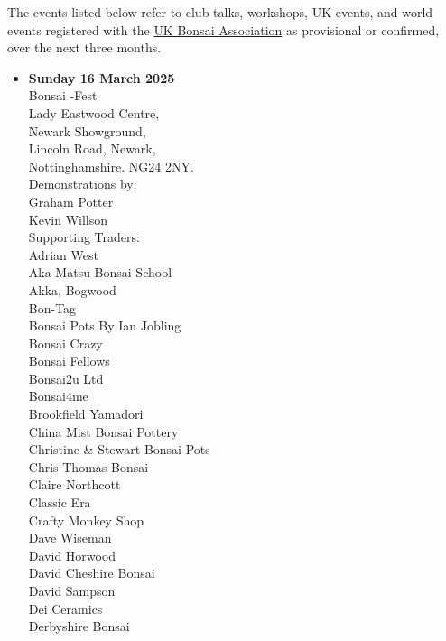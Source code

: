 \label{2025-03-events}
\noindent
The events listed below refer to club talks, workshops, UK events, and world events registered with the \href{https://www.ukbonsaiassoc.org/events.html}{UK Bonsai Association} as provisional or confirmed, over the next three months.
\begin{itemize}

    \item \textbf{Sunday 16 March 2025}
    \\
    Bonsai -Fest \\
    Lady Eastwood Centre, \\
    Newark Showground, \\
    Lincoln Road, Newark, \\
    Nottinghamshire. NG24 2NY. \\
    Demonstrations by: \\
    Graham Potter \\
    Kevin Willson \\
    Supporting Traders: \\
    Adrian West \\
    Aka Matsu Bonsai School \\
    Akka, Bogwood \\
    Bon-Tag \\
    Bonsai Pots By Ian Jobling \\
    Bonsai Crazy \\
    Bonsai Fellows \\
    Bonsai2u Ltd \\
    Bonsai4me \\
    Brookfield Yamadori \\
    China Mist Bonsai Pottery \\
    Christine \& Stewart Bonsai Pots \\
    Chris Thomas Bonsai \\
    Claire Northcott \\
    Classic Era \\
    Crafty Monkey Shop \\
    Dave Wiseman \\
    David Horwood \\
    David Cheshire Bonsai \\
    David Sampson \\
    Dei Ceramics \\
    Derbyshire Bonsai \\

\end{itemize}
